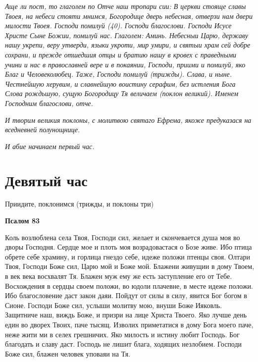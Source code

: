\itshape Аще ли пост, то глаголем по Отче наш тропари сии:\normalfont{} В церкви стояще славы Твоея, на небеси стояти мнимся, Богородице дверь небесная, отверзи нам двери милости Твоея. Господи помилуй (40). Господи благослови. Господи Исусе Христе Сыне Божии, помилуй нас. Глаголем: Аминь. Небесныи Царю, державу нашу укрепи, веру утверди, языки укроти, мир умири, и святыи храм сей добре сохрани, и прежде отшедшия отцы и братию нашу в кровех с праведными учини и нас в православней вере и в покаянии, Господи, приими и помилуй, яко Благ и Человеколюбец. Таже, Господи помилуй \itshape (трижды)\normalfont{}. Слава, и ныне. Честнейшую херувим, и славнейшую воистину серафим, без истления Бога Слова рождьшую, сущую Богородицу Тя величаем (поклон великий). Именем Господним благослови, отче.


\itshape И творим великия поклоны, с молитвою святаго Ефрема, якоже предуказася на вседневней полунощнице.\normalfont{}


\itshape И абие начинаем первый час.\normalfont{}




\section{Девятый час}
 


Приидите, поклонимся (трижды, и поклоны три)





\bfseries Псалом 83\normalfont{}


Коль возлюблена села Твоя, Господи сил, желает и скончевается душа моя во дворы Господня. Сердце мое и плоть моя возрадовастася о Бозе живе. Ибо птица обрете себе храмину, и горлица гнездо себе, идеже положи птенцы своя. Олтари Твоя, Господи Боже сил, Царю мой и Боже мой. Блажени живущии в дому Твоем, в век века восхвалят Тя. Блажен муж ему же есть заступление его от Тебе. Восхождения в сердцы своем положи, во юдоли плачевне, в месте идеже положи. Ибо благословение даст закон даяи. Пойдут от силы в силу, явится Бог богом в Сионе. Господи Боже сил, услыши молитву мою, внуши Боже Ияковль. Защитниче наш, виждь Боже, и призри на лице Христа Твоего. Яко лучше день един во дворех Твоих, паче тысящ. Изволих приметатися в дому Бога моего паче, неже жити ми в селех грешничих. Яко милость и истину любит Господь. Бог благодать и славу даст. Господь не лишит блага, ходящих незлобием. Господи Боже сил, блажен человек уповаяи на Тя.





